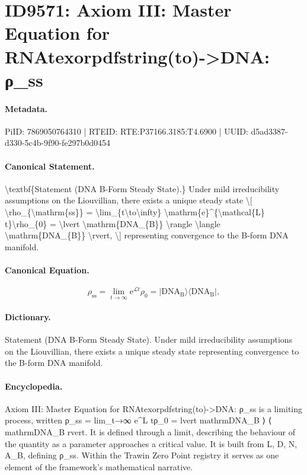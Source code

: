 \section*{ID9571: Axiom III: Master Equation for RNAtexorpdfstring(to)->DNA: ρ\_ss}
\paragraph{Metadata.}
PiID: 7869050764310 | RTEID: RTE:P37166.3185:T4.6900 | UUID: d5ad3387-d330-5c4b-9f90-fe297b0d0454

\paragraph{Canonical Statement.}
\textbackslash{}textbf\{Statement (DNA B-Form Steady State).\} Under mild irreducibility assumptions on the Liouvillian, there exists a unique steady state \textbackslash{}[ \textbackslash{}rho\_\{\textbackslash{}mathrm\{ss\}\} = \textbackslash{}lim\_\{t\textbackslash{}to\textbackslash{}infty\} \textbackslash{}mathrm\{e\}\textasciicircum{}\{\textbackslash{}mathcal\{L\} t\}\textbackslash{}rho\_\{0\} = \textbackslash{}lvert \textbackslash{}mathrm\{DNA\_\{B\}\} \textbackslash{}rangle \textbackslash{}langle \textbackslash{}mathrm\{DNA\_\{B\}\} \textbackslash{}rvert, \textbackslash{}] representing convergence to the B-form DNA manifold.

\paragraph{Canonical Equation.}
\[
\rho_{\mathrm{ss}} = \lim_{t\to\infty} \mathrm{e}^{\mathcal{L} t}\rho_{0} = \lvert \mathrm{DNA_{B}} \rangle \langle \mathrm{DNA_{B}} \rvert,
\]

\paragraph{Dictionary.}
Statement (DNA B-Form Steady State). Under mild irreducibility assumptions on the Liouvillian, there exists a unique steady state representing convergence to the B-form DNA manifold.

\paragraph{Encyclopedia.}
Axiom III: Master Equation for RNAtexorpdfstring(to)->DNA: ρ\_ss is a limiting process, written ρ\_ss = lim\_t→∞ e\textasciicircum{}L tρ\_0 = lvert mathrmDNA\_B ⟩ ⟨ mathrmDNA\_B rvert. It is defined through a limit, describing the behaviour of the quantity as a parameter approaches a critical value. It is built from L, D, N, A\_B, defining ρ\_ss. Within the Trawin Zero Point registry it serves as one element of the framework's mathematical narrative.
